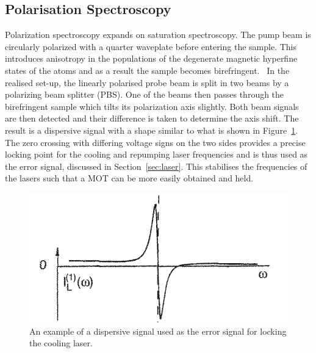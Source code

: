 \documentclass[twocolumn]{article}
\begin{document}
\subsection{Polarisation Spectroscopy} \label{sec:pol} %
Polarization spectroscopy expands on saturation spectroscopy. The pump beam is circularly polarized with a quarter waveplate before entering the sample. This introduces anisotropy in the populations of the degenerate magnetic hyperfine states of the atoms and as a result the sample becomes birefringent.~\cite{demtroder}
In the realised set-up, the linearly polarised probe beam is split in two beams by a polarizing beam splitter (PBS). One of the beams then passes through the birefringent sample which tilts its polarization axis slightly. Both beam signals are then detected and their difference is taken to determine the axis shift. The result is a dispersive signal with a shape similar to what is shown in Figure~\ref{fig:Dispersive}. The zero crossing with differing voltage signs on the two sides provides a precise locking point for the cooling and repumping laser frequencies and is thus used as the error signal, discussed in Section~\ref{sec:laser}. This stabilises the frequencies of the lasers such that a MOT can be more easily obtained and held.
\begin{figure}
\centering
\includegraphics[width=1\linewidth]{Images/Dispersive.png}
\caption{An example of a dispersive signal used as the error signal for locking the cooling laser.~\cite{demtroder}}
\label{fig:Dispersive}
\end{figure}
\end{document}
